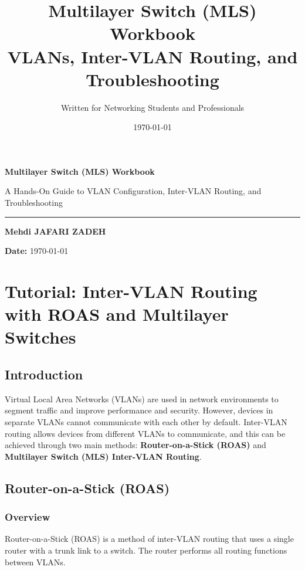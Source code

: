 \documentclass[a4paper]{book}
\title{\Huge \textbf{Multilayer Switch (MLS) Workbook}\\
       \Large VLANs, Inter-VLAN Routing, and Troubleshooting}
\author{\Large Written for Networking Students and Professionals}
\date{\today}
\begin{document}

\begin{titlepage}
    \centering

    \vspace*{4cm}
    {\Huge \textbf{Multilayer Switch (MLS) Workbook}\par}
    \vspace{0.8cm}
    {\Large A Hands-On Guide to VLAN Configuration, Inter-VLAN Routing, and Troubleshooting\par}
    \vspace{0.3cm}
    \rule{0.9\textwidth}{1pt}
    
    \vspace{0.6cm}
    {\large \textbf{Mehdi JAFARI ZADEH}}\par
    \vspace{0.3cm}

    \vfill
    \textbf{Date:} \today
    \vspace{2cm}
\end{titlepage}

\tableofcontents
\newpage

\chapter{Tutorial: Inter-VLAN Routing with ROAS and Multilayer Switches}
\section{Introduction}
Virtual Local Area Networks (VLANs) are used in network environments to segment traffic and improve performance and security. However, devices in separate VLANs cannot communicate with each other by default. Inter-VLAN routing allows devices from different VLANs to communicate, and this can be achieved through two main methods: \textbf{Router-on-a-Stick (ROAS)} and \textbf{Multilayer Switch (MLS) Inter-VLAN Routing}.

\section{Router-on-a-Stick (ROAS)}
\subsection{Overview}
Router-on-a-Stick (ROAS) is a method of inter-VLAN routing that uses a single router with a trunk link to a switch. The router performs all routing functions between VLANs.
\end{document}

